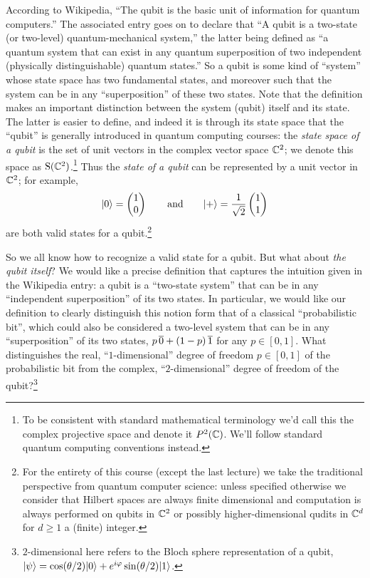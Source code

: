 According to Wikipedia, ``The qubit is the basic unit of information for quantum computers.'' The associated entry goes on to declare that ``A qubit is a two-state (or two-level) quantum-mechanical system,'' the latter being defined as ``a quantum system that can exist in any quantum superposition of two independent (physically distinguishable) quantum states.'' So a qubit is some kind of ``system'' whose state space has two fundamental states, and moreover such that the system can be in any ``superposition'' of these two states. Note that the definition makes an important distinction between the system (qubit) itself and its state. The latter is easier to define, and indeed it is through its state space that the  ``qubit'' is generally introduced in quantum computing courses: the \emph{state space of a qubit} is the set of unit vectors in the complex vector space $\mathbb{C}^2$; we denote this space as $\mathrm{S}(\mathbb{C}^2)$.\footnote{To be consistent with standard mathematical terminology we'd call this the complex projective space and denote it $P^2(\mathbb{C})$. We'll follow standard quantum computing conventions instead.} Thus the \emph{state of a qubit} can be represented by a unit vector in $\mathbb{C}^2$; for example, 
\[|0\rangle = \begin{pmatrix} 1 \\ 0 \end{pmatrix}\qquad\text{and}\qquad |+\rangle = \frac{1}{\sqrt{2}}\begin{pmatrix} 1 \\ 1 \end{pmatrix}\]
are both valid states for a qubit.\footnote{For the entirety of this course (except the last lecture) we take the traditional perspective from quantum computer science: unless specified otherwise we consider that Hilbert spaces are always finite dimensional and computation is always performed on qubits in $\mathbb{C}^2$ or possibly higher-dimensional qudits in $\mathbb{C}^d$ for $d\geq 1$ a (finite) integer.}

So we all know how to recognize a valid state for a qubit. But what about \emph{the qubit itself}? We would like a precise definition that captures the intuition given in the Wikipedia entry: a qubit is a ``two-state system'' that can be in any ``independent superposition'' of its two states. In particular, we would like our definition to clearly distinguish this notion form that of a classical ``probabilistic bit'', which could also be considered a two-level system that can be in any ``superposition'' of its two states, $p \,\overline{0} + (1-p)\,\overline{1}$ for any $p\in [0,1]$. What distinguishes the real, ``$1$-dimensional'' degree of freedom $p\in [0,1]$  of the probabilistic bit from the complex, ``$2$-dimensional'' degree of freedom of the qubit?\footnote{$2$-dimensional here refers to the Bloch sphere representation of a qubit, $|\psi\rangle= \cos(\theta/2)|0\rangle + e^{i\varphi} \sin(\theta/2)|1\rangle$.}


